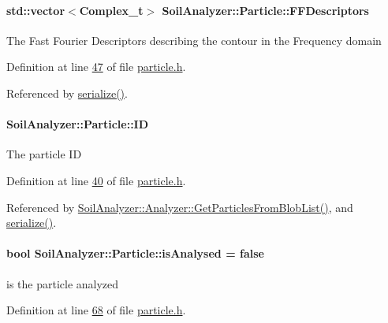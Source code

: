\paragraph[{F\+F\+Descriptors}]{\setlength{\rightskip}{0pt plus 5cm}std\+::vector$<${\bf Complex\+\_\+t}$>$ Soil\+Analyzer\+::\+Particle\+::\+F\+F\+Descriptors}\label{class_soil_analyzer_1_1_particle_ad953f0d8c12018f61cd957b28c1a56ae}
The Fast Fourier Descriptors describing the contour in the Frequency domain 

Definition at line \hyperlink{particle_8h_source_l00047}{47} of file \hyperlink{particle_8h_source}{particle.\+h}.



Referenced by \hyperlink{particle_8h_source_l00083}{serialize()}.

\hypertarget{class_soil_analyzer_1_1_particle_a2e8100d7c87bd754929fa957982ff5e5}{}
\paragraph[{I\+D}]{ Soil\+Analyzer\+::\+Particle\+::\+I\+D}\label{class_soil_analyzer_1_1_particle_a2e8100d7c87bd754929fa957982ff5e5}
The particle I\+D 

Definition at line \hyperlink{particle_8h_source_l00040}{40} of file \hyperlink{particle_8h_source}{particle.\+h}.



Referenced by \hyperlink{analyzer_8cpp_source_l00322}{Soil\+Analyzer\+::\+Analyzer\+::\+Get\+Particles\+From\+Blob\+List()}, and \hyperlink{particle_8h_source_l00083}{serialize()}.

\hypertarget{class_soil_analyzer_1_1_particle_aeae83a2d48d7682f7017210a2730b48b}{}
\paragraph[{is\+Analysed}]{\setlength{\rightskip}{0pt plus 5cm}bool Soil\+Analyzer\+::\+Particle\+::is\+Analysed = false}\label{class_soil_analyzer_1_1_particle_aeae83a2d48d7682f7017210a2730b48b}
is the particle analyzed 

Definition at line \hyperlink{particle_8h_source_l00068}{68} of file \hyperlink{particle_8h_source}{particle.\+h}.



